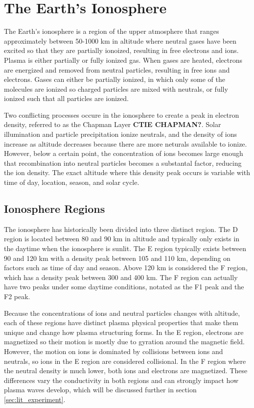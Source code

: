 \section{The Earth's Ionosphere}
\label{sec:ionosphere}
The Earth's ionosphere is a region of the upper atmosphere that ranges approximately between 50-1000 km in altitude where neutral gases have been excited so that they are partially ionoized, resulting in free electrons and ions.  Plasma is either partially or fully ionized gas.  When gases are heated, electrons are energized and removed from neutral particles, resulting in free ions and electrons.  Gases can either be partially ionized, in which only some of the molecules are ionized so charged particles are mixed with neutrals, or fully ionized such that all particles are ionized.

Two conflicting processes occure in the ionosphere to create a peak in electron density, referred to as the Chapman Layer \textbf{CTIE CHAPMAN?}.  Solar illumination and particle precipitation ionize neutrals, and the density of ions increase as altitude decreases because there are more neturals available to ionize.  However, below a certain point, the concentration of ions becomes large enough that recombination into neutral particles becomes a substantal factor, reducing the ion density.  The exact altitude where this density peak occurs is variable with time of day, location, season, and solar cycle.

\subsection{Ionosphere Regions}
\label{sec:ionosphere_regions}
The ionosphere has historically been divided into three distinct region.  The D region is located between 80 and 90 km in altitude and typically only exists in the daytime when the ionosphere is sunlit.  The E region typically exists between 90 and 120 km with a density peak between 105 and 110 km, depending on factors such as time of day and season.  Above 120 km is considered the F region, which has a density peak between 300 and 400 km.  The F region can actually have two peaks under some daytime conditions, notated as the F1 peak and the F2 peak.

Because the concentrations of ions and neutral particles changes with altitude, each of these regions have distinct plasma physical properties that make them unique and change how plasma structuring forms.  In the E region, electrons are magnetized so their motion is mostly due to gyration around the magnetic field.  However, the motion on ions is dominated by collisions between ions and neutrals, so ions in the E region are considered collisional.  In the F region where the neutral density is much lower, both ions and electrons are magnetized.  These differences vary the conductivity in both regions and can strongly impact how plasma waves develop, which will be discussed further in section \ref{sec:lit_experiment}.

